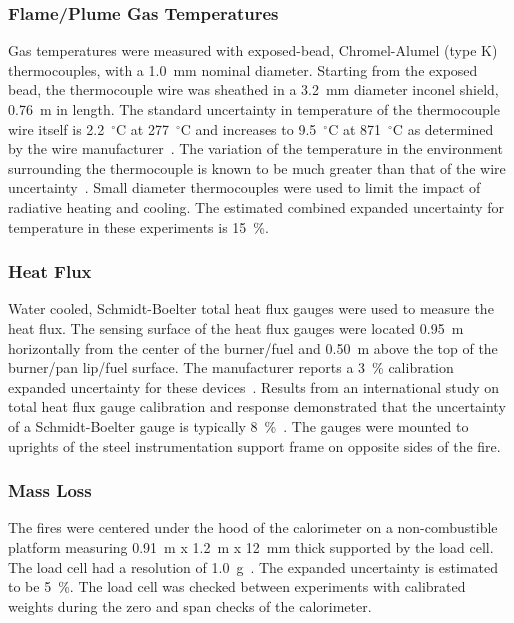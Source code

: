 \documentclass[twoside]{uocthesis}
\begin{document}
{\subsubsection{Flame/Plume Gas Temperatures}

Gas temperatures were measured with exposed-bead, Chromel-Alumel (type K) thermocouples, with a 1.0~mm nominal diameter.  Starting from the exposed bead, the thermocouple wire was sheathed in a 3.2~mm diameter inconel shield, 0.76~m in length.  The standard uncertainty in temperature of the thermocouple wire itself is 2.2~$^\circ$C at 277~$^\circ$C and increases to 9.5~$^\circ$C at 871~$^\circ$C as determined by the wire manufacturer~\cite{Omega}.  The variation of the temperature in the environment surrounding the thermocouple is known to be much greater than that of the wire uncertainty~\cite{Blevins:1999,Pitts:2001}. Small diameter thermocouples were used to limit the impact of radiative heating and cooling.  The estimated combined expanded uncertainty for temperature in these experiments is 15~\%.

\subsubsection{Heat Flux}

Water cooled, Schmidt-Boelter total heat flux gauges were used to measure the heat flux. The sensing surface of the heat flux gauges were located 0.95~m horizontally from the center of the burner/fuel and 0.50~m above the top of the burner/pan lip/fuel surface.  The manufacturer reports a 3~\% calibration expanded uncertainty for these devices~\cite{Medtherm}. Results from an international study on total heat flux gauge calibration and response demonstrated that the uncertainty of a Schmidt-Boelter gauge is typically 8~\%~\cite{Pitts:2006}.  The gauges were mounted to uprights of the steel instrumentation support frame on opposite sides of the fire.

\subsubsection{Mass Loss}

The fires were centered under the hood of the calorimeter on a non-combustible platform measuring 0.91~m x 1.2~m x 12~mm thick supported by the load cell.  The load cell had a resolution of 1.0~g~\cite{Mettler}. The expanded uncertainty is estimated to be 5~\%.  The load cell was checked between experiments with calibrated weights during the zero and span checks of the calorimeter.

}
\end{document}
